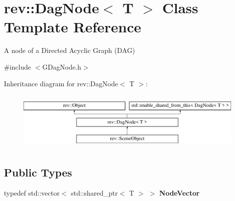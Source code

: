 \hypertarget{classrev_1_1_dag_node}{}\section{rev\+::Dag\+Node$<$ T $>$ Class Template Reference}
\label{classrev_1_1_dag_node}


A node of a Directed Acyclic Graph (D\+AG)  




{\ttfamily \#include $<$G\+Dag\+Node.\+h$>$}

Inheritance diagram for rev\+::Dag\+Node$<$ T $>$\+:\begin{figure}[H]
\begin{center}
\leavevmode
\includegraphics[height=2.876712cm]{classrev_1_1_dag_node}
\end{center}
\end{figure}
\subsection*{Public Types}
\begin{DoxyCompactItemize}
\item 
\mbox{\label{classrev_1_1_dag_node_acd8195e5da268318a0b4d34a8abe5948}} 
typedef std\+::vector$<$ std\+::shared\+\_\+ptr$<$ T $>$ $>$ {\bfseries Node\+Vector}
\end{DoxyCompactItemize}
